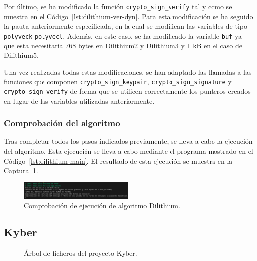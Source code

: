 Por último, se ha modificado la función \texttt{crypto\_sign\_verify} tal y como se muestra en el Código~\ref{lst:dilithium-ver-dyn}.
Para esta modificación se ha seguido la pauta anteriormente especificada, en la cual se modifican las variables de tipo \texttt{polyveck} \texttt{polyvecl}.
Además, en este caso, se ha modificado la variable \texttt{buf} ya que esta necesitaría 768 bytes en Dilithium2 y Dilithium3 y 1 kB en el caso de Dilithium5.

Una vez realizadas todas estas modificaciones, se han adaptado las llamadas a las funciones que componen \texttt{crypto\_sign\_keypair}, \texttt{crypto\_sign\_signature} y \texttt{crypto\_sign\_verify} de forma que se utilicen correctamente los punteros creados en lugar de las variables utilizadas anteriormente.


\subsubsection{Comprobación del algoritmo}\label{subsubsec:dilithium-compro}

Tras completar todos los pasos indicados previamente, se lleva a cabo la ejecución del algoritmo.
Esta ejecución se lleva a cabo mediante el programa mostrado en el Código~\ref{lst:dilithium-main}.
El resultado de esta ejecución se muestra en la Captura~\ref{fig:dilithium-check}.

\begin{figure}[h]
    \centering
    \includegraphics[width=0.5\textwidth]{figures/dilithium-check.png}
    \caption{Comprobación de ejecución de algoritmo Dilithium.}
    \label{fig:dilithium-check}
\end{figure}



\subsection{Kyber}\label{subsec:kyber}

\begin{figure}[H]
\centering
{}
\caption{Árbol de ficheros del proyecto Kyber.}
\label{tree:kyber}
\end{figure}

